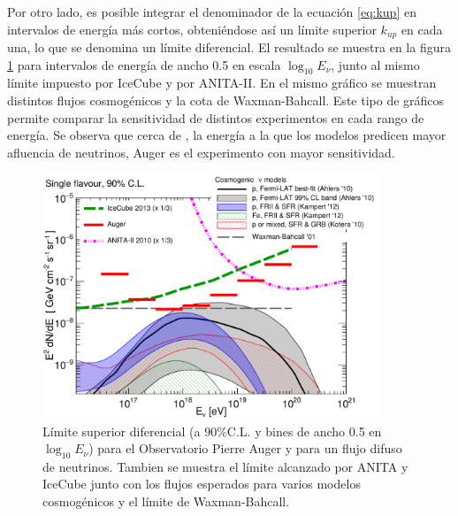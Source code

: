 	Por otro lado, es posible integrar el denominador de la ecuaci\'on \ref{eq:kup} en intervalos de energ\'ia m\'as cortos, obteni\'endose as\'i un l\'imite superior $k_{up}$ en cada una, lo que se denomina un l\'imite diferencial. 
	El resultado se muestra en la figura \ref{fig:difLimits} para intervalos de energ\'ia de ancho 0.5 en escala $\log_{10}E_\nu$, junto al mismo l\'imite impuesto por IceCube y por ANITA-II.
	En el mismo gr\'afico se muestran distintos flujos cosmog\'enicos y la cota de Waxman-Bahcall.
	Este tipo de gr\'aficos permite comparar la sensitividad de distintos experimentos en cada rango de energ\'ia.
	Se observa que cerca de , la energ\'ia a la que los modelos predicen mayor afluencia de neutrinos, Auger es el experimento con mayor sensitividad.
	\begin{figure}[ht!]
		\begin{center}
			\includegraphics[width=0.9\textwidth]{fig/resultadosAuger/diff_limits_and_models_paper_combined_all}
			\caption{\label{fig:difLimits}
			L\'imite superior diferencial (a $90\%$C.L. y bines de ancho 0.5 en $\log_{10}E_\nu$) para el Observatorio Pierre Auger y para un flujo difuso de neutrinos.
			Tambien se muestra el l\'imite alcanzado por ANITA\cite{cite:Anita2} y IceCube\cite{cite:IceCubePev} junto con los flujos esperados para varios modelos cosmog\'enicos\cite{Kotera_GZK,Kampert_GZK,Ahlers_GZK,Becker_AGN} y el l\'imite de Waxman-Bahcall\cite{cite:WaxmanBahcall1}.
			}
		\end{center}
	\end{figure}
	
